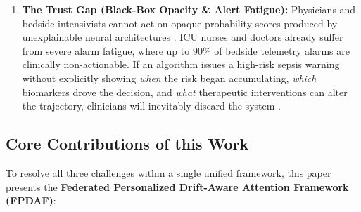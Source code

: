 \documentclass[final,5p,times,twocolumn]{elsarticle}
\begin{document}
\begin{enumerate}
    \item \textbf{The Trust Gap (Black-Box Opacity \& Alert Fatigue):} Physicians and bedside intensivists cannot act on opaque probability scores produced by unexplainable neural architectures \cite{lundberg2018explainable,sundararajan2017axiomatic}. ICU nurses and doctors already suffer from severe alarm fatigue, where up to $90\%$ of bedside telemetry alarms are clinically non-actionable. If an algorithm issues a high-risk sepsis warning without explicitly showing \textit{when} the risk began accumulating, \textit{which} biomarkers drove the decision, and \textit{what} therapeutic interventions can alter the trajectory, clinicians will inevitably discard the system \cite{choi2016retain,larocca2021attention}.
\end{enumerate}

\subsection{Core Contributions of this Work}
To resolve all three challenges within a single unified framework, this paper presents the \textbf{Federated Personalized Drift-Aware Attention Framework (FPDAF)}:
\end{document}
